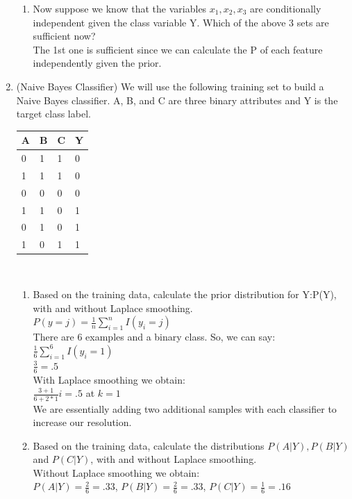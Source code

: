 \documentclass[12pt,letterpaper]{article}
\begin{document}
\begin{enumerate}
\begin{enumerate}
		\item Now suppose we know that the variables $x_{1},x_{2},x_{3}$ are conditionally independent given the class variable Y. Which of the above 3 sets are sufficient now? \\
		The 1st one is sufficient since we can calculate the P of each feature independently given the prior.\\
	\end{enumerate} 
	\item (Naive Bayes Classifier) We will use the following training set to build a Naive Bayes classifier. A, B, and C are three binary attributes and Y is the target class label. \\[10mm]
	\centering
	\begin{tabular}{| l | l | l | l |} 
	\hline
	A & B & C & Y \\ \hline 
	0 & 1 & 1 & 0 \\ \hline
	1 & 1 & 1 & 0 \\ \hline
	0 & 0 & 0 & 0 \\ \hline
	1 & 1 & 0 & 1 \\ \hline
	0 & 1 & 0 & 1 \\ \hline
	1 & 0 & 1 & 1 \\ \hline 
	\end{tabular} \\[15mm]
	\begin{enumerate} 
		\item Based on the training data, calculate the prior distribution for Y:P(Y), with and without Laplace smoothing. \\
		$P(y = j) = \frac{1}{n} \sum_{i=1}^{n} I(y_{i} = j)$ \\
		There are 6 examples and a binary class. So, we can say: \\
		$\frac{1}{6} \sum_{i=1}^{6} I(y_{i} = 1)$ \\
		$\frac{3}{6} = .5$ \\
		With Laplace smoothing we obtain: \\
		$\frac{3+1}{6+2*1}i = .5$ at $ k = 1$ \\ 
		We are essentially adding two additional samples with each classifier to increase our resolution. \\ 
		\item Based on the training data, calculate the distributions $P(A|Y), P(B|Y)$ and $P(C|Y)$, with and without Laplace smoothing. \\
		Without Laplace smoothing we obtain: \\
		$P(A|Y) = \frac{2}{6} = .33$, $P(B|Y) = \frac{2}{6} = .33$, $P(C|Y) = \frac{1}{6} = .16$ \\

\end{enumerate}
\end{enumerate}
\end{document}
